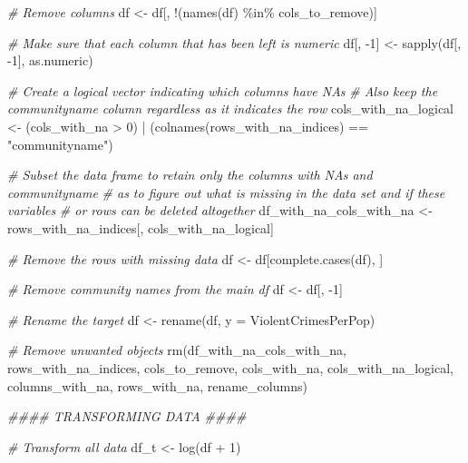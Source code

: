 \documentclass[
  11pt,
]{article}
\newenvironment{Shaded}{}{}
\newcommand{\AttributeTok}[1]{\textcolor[rgb]{0.49,0.56,0.16}{#1}}
\newcommand{\CommentTok}[1]{\textcolor[rgb]{0.38,0.63,0.69}{\textit{#1}}}
\newcommand{\DecValTok}[1]{\textcolor[rgb]{0.25,0.63,0.44}{#1}}
\newcommand{\DocumentationTok}[1]{\textcolor[rgb]{0.73,0.13,0.13}{\textit{#1}}}
\newcommand{\FunctionTok}[1]{\textcolor[rgb]{0.02,0.16,0.49}{#1}}
\newcommand{\NormalTok}[1]{#1}
\newcommand{\OtherTok}[1]{\textcolor[rgb]{0.00,0.44,0.13}{#1}}
\newcommand{\SpecialCharTok}[1]{\textcolor[rgb]{0.25,0.44,0.63}{#1}}
\newcommand{\StringTok}[1]{\textcolor[rgb]{0.25,0.44,0.63}{#1}}
\begin{document}
\begin{Shaded}
\begin{Highlighting}[]
\CommentTok{\# Remove columns}
\NormalTok{df }\OtherTok{\textless{}{-}}\NormalTok{ df[, }\SpecialCharTok{!}\NormalTok{(}\FunctionTok{names}\NormalTok{(df) }\SpecialCharTok{\%in\%}\NormalTok{ cols\_to\_remove)]}

\CommentTok{\# Make sure that each column that has been left is numeric}
\NormalTok{df[, }\SpecialCharTok{{-}}\DecValTok{1}\NormalTok{] }\OtherTok{\textless{}{-}} \FunctionTok{sapply}\NormalTok{(df[, }\SpecialCharTok{{-}}\DecValTok{1}\NormalTok{], as.numeric)}

\CommentTok{\# Create a logical vector indicating which columns have NA\textquotesingle{}s}
  \CommentTok{\# Also keep the \textquotesingle{}communityname\textquotesingle{} column regardless as it indicates the row}
\NormalTok{cols\_with\_na\_logical }\OtherTok{\textless{}{-}}\NormalTok{ (cols\_with\_na }\SpecialCharTok{\textgreater{}} \DecValTok{0}\NormalTok{) }\SpecialCharTok{|} 
\NormalTok{  (}\FunctionTok{colnames}\NormalTok{(rows\_with\_na\_indices) }\SpecialCharTok{==} \StringTok{"communityname"}\NormalTok{)}

\CommentTok{\# Subset the data frame to retain only the columns with NA\textquotesingle{}s and \textquotesingle{}communityname\textquotesingle{}}
  \CommentTok{\# as to figure out what is missing in the data set and if these variables}
  \CommentTok{\# or rows can be deleted altogether}
\NormalTok{df\_with\_na\_cols\_with\_na }\OtherTok{\textless{}{-}}\NormalTok{ rows\_with\_na\_indices[, cols\_with\_na\_logical]}

\CommentTok{\# Remove the rows with missing data}
\NormalTok{df }\OtherTok{\textless{}{-}}\NormalTok{ df[}\FunctionTok{complete.cases}\NormalTok{(df), ]}

\CommentTok{\# Remove community names from the main df}
\NormalTok{df }\OtherTok{\textless{}{-}}\NormalTok{ df[, }\SpecialCharTok{{-}}\DecValTok{1}\NormalTok{]}

\CommentTok{\# Rename the target}
\NormalTok{df }\OtherTok{\textless{}{-}} \FunctionTok{rename}\NormalTok{(df, }\AttributeTok{y =}\NormalTok{ ViolentCrimesPerPop)}

\CommentTok{\# Remove unwanted objects}
\FunctionTok{rm}\NormalTok{(df\_with\_na\_cols\_with\_na, rows\_with\_na\_indices, cols\_to\_remove, cols\_with\_na,}
\NormalTok{     cols\_with\_na\_logical, columns\_with\_na, rows\_with\_na, rename\_columns)}

\DocumentationTok{\#\#\#\# TRANSFORMING DATA \#\#\#\#}

\CommentTok{\# Transform all data}
\NormalTok{df\_t }\OtherTok{\textless{}{-}} \FunctionTok{log}\NormalTok{(df }\SpecialCharTok{+} \DecValTok{1}\NormalTok{)}


\end{Highlighting}
\end{Shaded}
\end{document}
